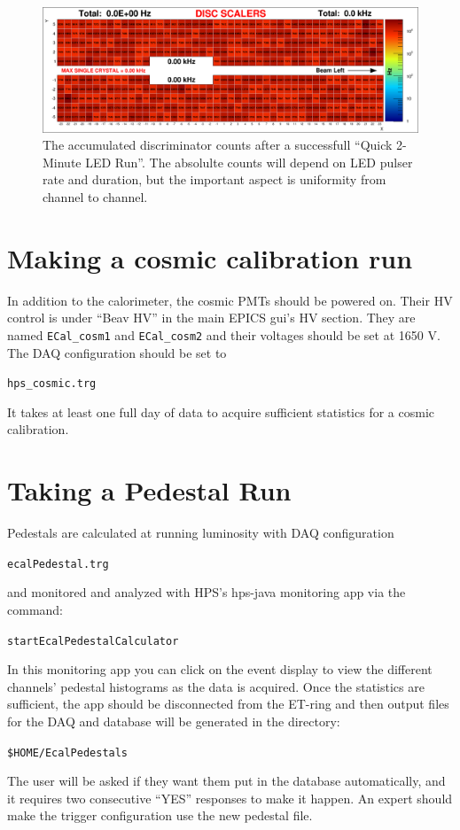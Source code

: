 \documentclass[12pt]{article}
\begin{document}
  \begin{figure}[htbp]\centering
      \includegraphics[width=14cm]{pics/ledScanBlue_2015_04_17_10-45-53.png}
      \caption{The accumulated discriminator counts after a successfull ``Quick 2-Minute LED Run''.  The absolulte counts will depend on LED pulser rate and duration, but the important aspect is uniformity from channel to channel.  \label{fig:quickledscanresult}}
  \end{figure}


   \section{Making a cosmic calibration run}

   In addition to the calorimeter, the cosmic PMTs should be powered on.  Their HV control is under ``Beav HV'' in the main EPICS gui's HV section.  They are named \texttt{ECal\_cosm1} and \texttt{ECal\_cosm2} and their voltages should be set at 1650 V.  The DAQ configuration should be set to \begin{center}\texttt{hps\_cosmic.trg}\end{center}  It takes at least one full day of data to acquire sufficient statistics for a cosmic calibration.

   \section{Taking a Pedestal Run}

   Pedestals are calculated at running luminosity with DAQ configuration \begin{center}\texttt{ecalPedestal.trg}\end{center} and monitored and analyzed with HPS's hps-java monitoring app via the command:
       \begin{center}\texttt{startEcalPedestalCalculator}\end{center}
       In this monitoring app you can click on the event display to view the different channels' pedestal histograms as the data is acquired.  Once the statistics are sufficient, the app should be disconnected from the ET-ring and then output files for the DAQ and database will be generated in the directory:\begin{center}\texttt{\$HOME/EcalPedestals}\end{center}  The user will be asked if they want them put in the database automatically, and it requires two consecutive ``YES'' responses to make it happen.  An expert should make the trigger configuration use the new pedestal file.
\end{document}
